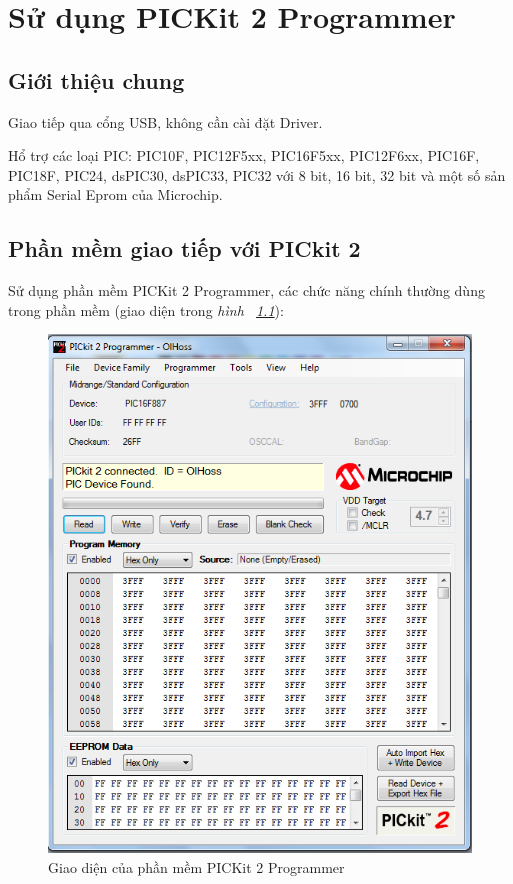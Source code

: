 \chapter{Sử dụng PICKit 2 Programmer}
\tocless \section{Giới thiệu chung}
\begin{list}{--}{}
\item Giao tiếp qua cổng USB, không cần cài đặt Driver.
\item Hổ trợ các loại PIC: PIC10F, PIC12F5xx, PIC16F5xx, PIC12F6xx, PIC16F, PIC18F, PIC24, dsPIC30, dsPIC33, PIC32 với 8 bit, 16 bit, 32 bit và một số sản phẩm Serial Eprom của Microchip.
\end{list}
\tocless \section{Phần mềm giao tiếp với PICkit 2}
Sử dụng phần mềm PICKit 2 Programmer, các chức năng chính thường dùng trong phần mềm (giao diện trong \textit{hình ~\ref{Fig:PICKIT-2}}):
\begin{figure}[!h]
\begin{center}
\includegraphics[scale=.5]{phu-luc/image/pickit-21}
\end{center}
\caption{Giao diện của phần mềm PICKit 2 Programmer}
\label{Fig:PICKIT-2}
\end{figure}
